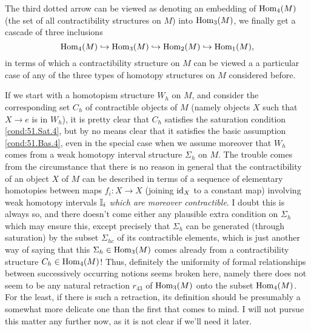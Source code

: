 The third dotted arrow can be viewed as denoting an embedding of
$\operatorname{Hom}_4(M)$ (the set of all contractibility structures on $M$) into
$\operatorname{Hom}_3(M)$, we finally get a cascade of three inclusions
\[\operatorname{Hom}_4(M) \hookrightarrow
\operatorname{Hom}_3(M) \hookrightarrow
\operatorname{Hom}_2(M) \hookrightarrow
\operatorname{Hom}_1(M),\]
in terms of which a contractibility structure on $M$ can be viewed a a
particular case of any of the three types of homotopy structures on
$M$ considered before.

If we start with a homotopism structure $W_h$ on $M$, and consider the
corresponding set $C_h$ of contractible objects of $M$ (namely objects
$X$ such that $X\to e$ is in $W_h$), it is pretty clear that $C_h$
satisfies the saturation condition \ref{cond:51.Sat.4}, but by no
means clear that it satisfies the basic assumption
\ref{cond:51.Bas.4}, even in the special case when we assume moreover
that $W_h$ comes from a weak homotopy interval structure $\Sigma_h$ on
$M$. The trouble comes from the circumstance that there is no reason
in general that the contractibility of an object $X$ of $M$ can be
described in terms of a sequence of elementary homotopies between maps
$f_i:X\to X$ (joining $\operatorname{id}_X$ to a constant map) involving weak
homotopy intervals ${\mathbb{I}}_i$ \emph{which are moreover contractible}. I
doubt this is always so, and there doesn't come either any plausible
extra condition on $\Sigma_h$ which may ensure this, except precisely
that $\Sigma_h$ can be generated (through saturation) by
the subset $\Sigma_{hc}$ of its contractible elements, which is just
another way of saying that this $\Sigma_h\in\operatorname{Hom}_3(M)$ comes already
from a contractibility structure $C_h\in\operatorname{Hom}_4(M)$! Thus, definitely
the uniformity of formal relationships between successively occurring
notions seems broken here, namely there does not seem to be any
natural retraction $r_{43}$ of $\operatorname{Hom}_3(M)$ onto the subset
$\operatorname{Hom}_4(M)$. For the least, if there is such a retraction, its
definition should be presumably a somewhat more delicate one than the
first that comes to mind. I will not pursue this matter any further
now, as it is not clear if we'll need it later.

